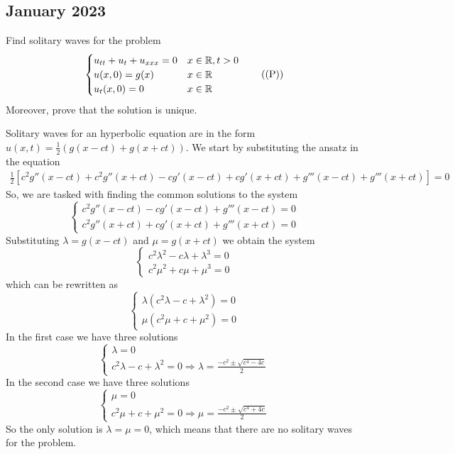 \subsection{January 2023}
\begin{exercise}
    Find solitary waves for the problem
    \[
        \begin{cases}
            u_{tt} + u_t + u_{xxx} = 0 & x \in \mathbb{R}, t > 0 \\
            u(x, 0) = g(x)             & x \in \mathbb{R}        \\
            u_t(x, 0) = 0              & x \in \mathbb{R}
        \end{cases}
        \tag{(P)}
    \]
    Moreover, prove that the solution is unique.
\end{exercise}
Solitary waves for an hyperbolic equation are in the form \(u(x, t) = \frac{1}{2} \left( g(x - ct) + g(x + ct) \right)\). We start by substituting the ansatz in the equation
\[
    \begin{split}
        \frac{1}{2} \left[c^2 g''(x - ct) + c^2 g''(x + ct) -c g'(x - ct) + c g'(x + ct)  + g'''(x - ct) + g'''(x + ct) \right] = 0
    \end{split}
\]
So, we are tasked with finding the common solutions to the system
\[
    \begin{cases}
        c^2 g''(x - ct) - c g'(x - ct) + g'''(x - ct) = 0 \\
        c^2 g''(x + ct) + c g'(x + ct) + g'''(x + ct) = 0
    \end{cases}
\]
Substituting \(\lambda = g(x - ct)\) and \(\mu = g(x + ct)\) we obtain the
system
\[
    \begin{cases}
        c^2 \lambda^2 - c \lambda + \lambda^3 = 0 \\
        c^2 \mu^2 + c \mu + \mu^3 = 0
    \end{cases}
\]
which can be rewritten as
\[
    \begin{cases}
        \lambda\left( c^2 \lambda - c + \lambda^2 \right) = 0 \\
        \mu\left( c^2 \mu + c + \mu^2 \right) = 0
    \end{cases}
\]
In the first case we have three solutions
\[
    \begin{cases}
        \lambda = 0 \\
        c^2 \lambda - c + \lambda^2 = 0 \Rightarrow \lambda = \frac{-c^2 \pm \sqrt{c^4 - 4c}}{2}
    \end{cases}
\]
In the second case we have three solutions
\[
    \begin{cases}
        \mu = 0 \\
        c^2 \mu + c + \mu^2 = 0 \Rightarrow \mu = \frac{-c^2 \pm \sqrt{c^4 + 4c}}{2}
    \end{cases}
\]
So the only solution is \(\lambda = \mu = 0\), which means that there are no
solitary waves for the problem.

